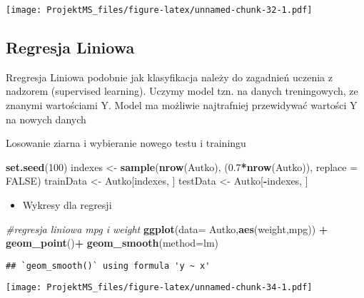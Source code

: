\documentclass[
]{article}
\newenvironment{Shaded}{\begin{snugshade}}{\end{snugshade}}
\newcommand{\CommentTok}[1]{\textcolor[rgb]{0.56,0.35,0.01}{\textit{#1}}}
\newcommand{\DataTypeTok}[1]{\textcolor[rgb]{0.13,0.29,0.53}{#1}}
\newcommand{\DecValTok}[1]{\textcolor[rgb]{0.00,0.00,0.81}{#1}}
\newcommand{\FloatTok}[1]{\textcolor[rgb]{0.00,0.00,0.81}{#1}}
\newcommand{\KeywordTok}[1]{\textcolor[rgb]{0.13,0.29,0.53}{\textbf{#1}}}
\newcommand{\NormalTok}[1]{#1}
\newcommand{\OperatorTok}[1]{\textcolor[rgb]{0.81,0.36,0.00}{\textbf{#1}}}
\newcommand{\OtherTok}[1]{\textcolor[rgb]{0.56,0.35,0.01}{#1}}
\newcommand{\StringTok}[1]{\textcolor[rgb]{0.31,0.60,0.02}{#1}}
\providecommand{\tightlist}{%
  \setlength{\itemsep}{0pt}\setlength{\parskip}{0pt}}
\begin{document}
\texttt{[image: ProjektMS\_files/figure-latex/unnamed-chunk-32-1.pdf]}

\hypertarget{regresja-liniowa}{%
\subsection{Regresja Liniowa}\label{regresja-liniowa}}

Rregresja Liniowa podobnie jak klasyfikacja należy do zagadnień uczenia
z nadzorem (supervised learning). Uczymy model tzn. na danych
treningowych, ze znanymi wartościami Y. Model ma możliwie najtrafniej
przewidywać wartości Y na nowych danych

Losowanie ziarna i wybieranie nowego testu i trainingu

\begin{Shaded}
\begin{Highlighting}[]
\KeywordTok{set.seed}\NormalTok{(}\DecValTok{100}\NormalTok{)}
\NormalTok{indexes <-}\StringTok{ }\KeywordTok{sample}\NormalTok{(}\KeywordTok{nrow}\NormalTok{(Autko), (}\FloatTok{0.7}\OperatorTok{*}\KeywordTok{nrow}\NormalTok{(Autko)), }\DataTypeTok{replace =} \OtherTok{FALSE}\NormalTok{)}
\NormalTok{trainData <-}\StringTok{ }\NormalTok{Autko[indexes, ]}
\NormalTok{testData <-}\StringTok{ }\NormalTok{Autko[}\OperatorTok{-}\NormalTok{indexes, ]}
\end{Highlighting}
\end{Shaded}

\begin{itemize}
\tightlist
\item
  Wykresy dla regresji
\end{itemize}

\begin{Shaded}
\begin{Highlighting}[]
\CommentTok{#regresja liniowa mpg i weight}
\KeywordTok{ggplot}\NormalTok{(}\DataTypeTok{data=}\NormalTok{ Autko,}\KeywordTok{aes}\NormalTok{(weight,mpg)) }\OperatorTok{+}\StringTok{ }\KeywordTok{geom_point}\NormalTok{()}\OperatorTok{+}\StringTok{ }\KeywordTok{geom_smooth}\NormalTok{(}\DataTypeTok{method=}\NormalTok{lm) }
\end{Highlighting}
\end{Shaded}

\begin{verbatim}
## `geom_smooth()` using formula 'y ~ x'
\end{verbatim}

\texttt{[image: ProjektMS\_files/figure-latex/unnamed-chunk-34-1.pdf]}
\end{document}

